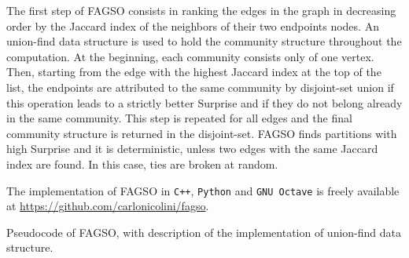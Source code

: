 The first step of FAGSO consists in ranking the edges in the graph in decreasing order by the Jaccard index of the neighbors of their two endpoints nodes.
An union-find data structure is used to hold the community structure throughout the computation.
At the beginning, each community consists only of one vertex.
Then, starting from the edge with the highest Jaccard index at the top of the list, the endpoints are attributed to the same community by disjoint-set union if this operation leads to a strictly better Surprise and if they do not belong already in the same community.
This step is repeated for all edges and the final community structure is returned in the disjoint-set.
FAGSO finds partitions with high Surprise and it is deterministic, unless two edges with the same Jaccard index are found. In this case, ties are broken at random. 

The implementation of FAGSO in \texttt{C++}, \texttt{Python} and \texttt{GNU Octave} is freely available at \url{https://github.com/carlonicolini/fagso}.

\begin{Algorithm}[htb!]

\caption{Pseudocode of FAGSO, with description of the implementation of union-find data structure.}
\label{alg:fagso}
\end{Algorithm}

